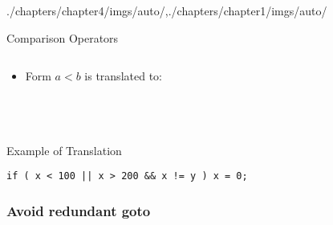 \begin{graphicspathcontext}{{./chapters/chapter4/imgs/auto/},{./chapters/chapter1/imgs/auto/}}
\begin{bibunit}[apalike]
\begin{frame}{Comparison Operators}
	\begin{columns}
		\begin{column}{.3\linewidth}
			\begin{center}
			\end{center}
		\end{column}
		\begin{column}{.7\linewidth}
			\begin{footnotesize}
			\begin{sdd}
			\end{sdd}
			\end{footnotesize}
		\end{column}
	\end{columns}
	\vspace{.5cm}
	\begin{itemize}
	\item Form $a<b$ is translated to: \\
		 \\
		 \\
		 \\
	\end{itemize}
\end{frame}

\begin{frame}[fragile]{Example of Translation}
	\begin{lstlisting}[style=lststyle-java]
		if ( x < 100 || x > 200 && x != y ) x = 0;
	\end{lstlisting}
	\vfill
	\begin{tac}
	\tacdots[L1]
	\end{tac}
\end{frame}

\subsubsection{Avoid redundant goto}
\subsubsectiontableofcontentslide


\end{bibunit}
\end{graphicspathcontext}
